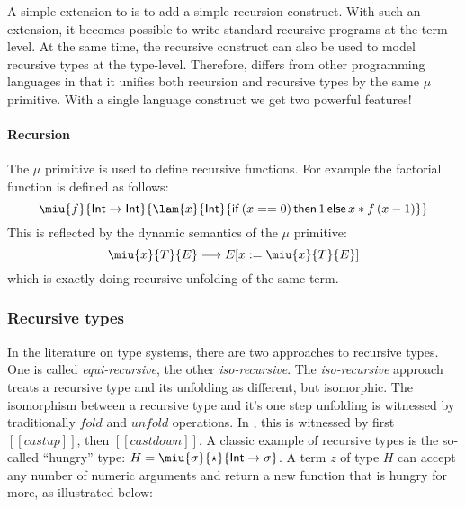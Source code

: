 A simple extension to \name is to add a simple recursion construct.
With such an extension, it becomes possible to write standard
recursive programs at the term level. At the same time, the recursive
construct can also be used to model recursive types at the type-level.
Therefore, \name differs from other programming languages in that it
unifies both recursion and recursive types by the same $\mu$
primitive. With a single language construct we get two powerful
features!

\paragraph{Recursion}

The $\mu$ primitive is used to define recursive functions.
For example the factorial function is defined as follows: 
\[\miu{f}{\mathsf{Int} \rightarrow
  \mathsf{Int}}{\lam{x}{\mathsf{Int}}{\mathsf{if}\,(x ==
    0)\,\mathsf{then}\,1\,\mathsf{else}\,x * f\,(x - 1)}}\] 
This is reflected by the dynamic semantics of the $\mu$ primitive:
\[\miu{x}{T}{E} \longrightarrow E[x:=\miu{x}{T}{E}]\]
which is exactly doing recursive unfolding of the same term.


\subsubsection{Recursive types}
In the literature on type systems, there are two approaches to
recursive types. One is called \emph{equi-recursive}, the other
\emph{iso-recursive}. The \emph{iso-recursive}
approach treats a recursive type and its unfolding as different, but
isomorphic. The isomorphism between a recursive type and it's one step 
unfolding is witnessed by traditionally $fold$ and $unfold$
operations.
In \name, this is witnessed by first $[[castup]]$, then
$[[castdown]]$. A classic example of recursive types is the so-called
``hungry'' type: $H = \miu{\sigma}{\star}{\mathsf{Int} \rightarrow
  \sigma}$. A term $z$ of type $H$ can accept any number of numeric
arguments and return a new function that is hungry for more, as
illustrated below:

